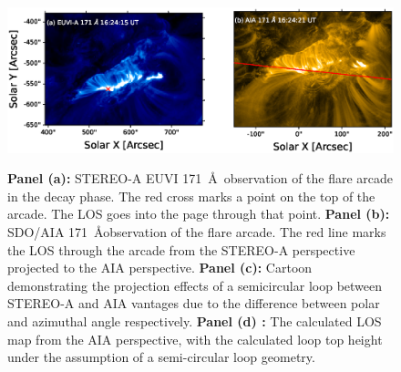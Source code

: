 \documentclass[a4paper,11pt]{article}
\begin{document}
\begin{figure}[ht!]
    \centering
    \includegraphics[width=\textwidth,trim={0 0 0 2cm},clip]{Figures/flare_orient.eps} \\
    \hspace{.8cm}
    \vspace{-1cm}
    \caption{\textbf{Panel (a):} STEREO-A EUVI 171~\AA~observation of the flare arcade in the decay phase. The red cross marks a point on the top of the arcade. The LOS goes into the page through that point. \textbf{Panel (b):} SDO/AIA 171~\AA observation of the flare arcade. The red line marks the LOS through the arcade from the STEREO-A perspective projected to the AIA perspective. \textbf{Panel (c):} Cartoon demonstrating the projection effects of a semicircular loop between STEREO-A and AIA vantages due to the difference between polar and azimuthal angle respectively. \textbf{Panel (d) :} The calculated LOS map from the AIA perspective, with the calculated loop top height under the assumption of a semi-circular loop geometry.}
    \label{fig:flare_orient}
\end{figure}
\end{document}

